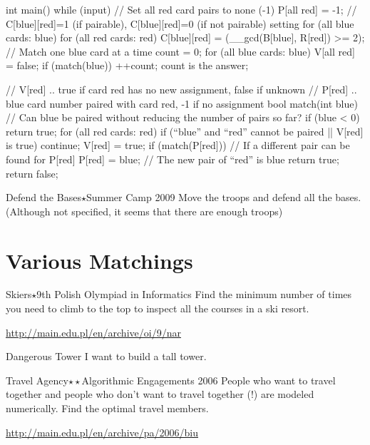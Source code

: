 \begin{cbox}
int main() {
    while (input) {
       // Set all red card pairs to none (-1)
       P[all red] = -1;
       // C[blue][red]=1 (if pairable), C[blue][red]=0 (if not pairable)
       setting
       for (all blue cards: blue)
           for (all red cards: red)
               C[blue][red] = (__gcd(B[blue], R[red]) >= 2);
       // Match one blue card at a time
       count = 0;
       for (all blue cards: blue) {
           V[all red] = false;
           if (match(blue)) ++count;
       }
       count is the answer;
    }
}
\end{cbox}

\begin{cbox}
// V[red] .. true if card red has no new assignment, false if unknown
// P[red] .. blue card number paired with card red, -1 if no assignment
bool match(int blue) { // Can blue be paired without reducing the number of pairs so far?
    if (blue < 0) return true;
    for (all red cards: red) {
       if (``blue'' and ``red'' cannot be paired || V[red] is true) continue;
       V[red] = true;
       if (match(P[red])) { // If a different pair can be found for P[red]
         P[red] = blue; // The new pair of ``red'' is blue
         return true;
       }
    }
    return false;
}
\end{cbox}

\begin{pbox}{Defend the Bases$\star$}{Summer Camp 2009}
Move the troops and defend all the bases. (Although not specified, it seems that there are enough troops)
  
\end{pbox}
\section{Various Matchings}

\begin{pbox}{Skiers$\star$}{9th Polish Olympiad in Informatics}
Find the minimum number of times you need to climb to the top to inspect all the courses in a ski resort.

\url{http://main.edu.pl/en/archive/oi/9/nar}
\end{pbox}

\begin{pbox}{Dangerous Tower}
I want to build a tall tower.
\end{pbox}

\begin{pbox}{Travel Agency$\star\star$}{Algorithmic Engagements 2006}
People who want to travel together and people who don't want to travel together (!) are modeled numerically.
Find the optimal travel members.

\url{http://main.edu.pl/en/archive/pa/2006/biu}
\end{pbox}

